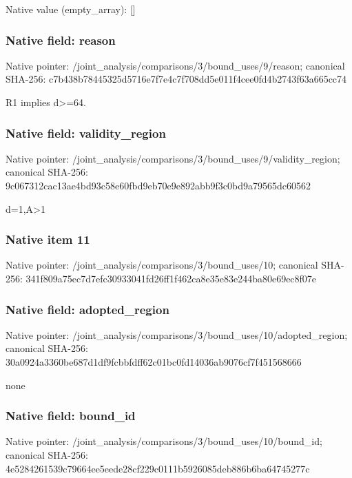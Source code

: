 \documentclass[10pt,a4paper]{article}
\begin{document}
Native value (empty\_\allowbreak{}array): []

\subsubsection{Native field: reason}
Native pointer: /joint\_\allowbreak{}analysis/comparisons/3/bound\_\allowbreak{}uses/9/reason; canonical SHA-256: c7b438b78445325d5716e7f7e4c7f708dd5e011f4cee0fd4b2743f63a665cc74

\begingroup\raggedright\sloppy R1 implies d>=\allowbreak{}64.\par\endgroup

\subsubsection{Native field: validity\_\allowbreak{}region}
Native pointer: /joint\_\allowbreak{}analysis/comparisons/3/bound\_\allowbreak{}uses/9/validity\_\allowbreak{}region; canonical SHA-256: 9c067312cac13ae4bd93c58e60fbd9eb70e9e892abb9f3c0bd9a79565dc60562

\begingroup\raggedright\sloppy d=\allowbreak{}1,\allowbreak{}A>1\par\endgroup

\subsubsection{Native item 11}
Native pointer: /joint\_\allowbreak{}analysis/comparisons/3/bound\_\allowbreak{}uses/10; canonical SHA-256: 341f809a75ec7d7efc30933041fd26ff1f462ca8e35e83e244ba80e69ec8f07e

\subsubsection{Native field: adopted\_\allowbreak{}region}
Native pointer: /joint\_\allowbreak{}analysis/comparisons/3/bound\_\allowbreak{}uses/10/adopted\_\allowbreak{}region; canonical SHA-256: 30a0924a3360be687d1df9fcbbfdff62c01bc0fd14036ab9076cf7f451568666

\begingroup\raggedright\sloppy none\par\endgroup

\subsubsection{Native field: bound\_\allowbreak{}id}
Native pointer: /joint\_\allowbreak{}analysis/comparisons/3/bound\_\allowbreak{}uses/10/bound\_\allowbreak{}id; canonical SHA-256: 4e5284261539c79664ee5eede28cf229c0111b5926085deb886b6ba64745277c
\end{document}
